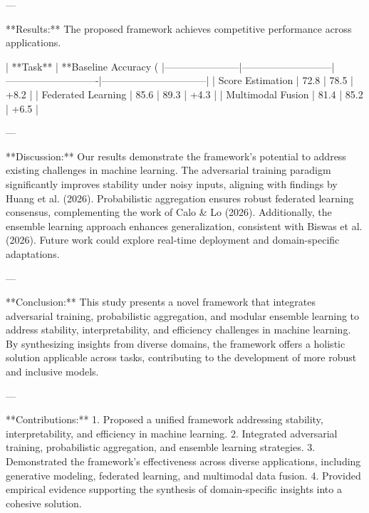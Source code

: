 ---

**Results:**  
The proposed framework achieves competitive performance across applications.  

| **Task**             | **Baseline Accuracy (%
|-----------------------|---------------------------|----------------------------|--------------------------------|  
| Score Estimation      | 72.8                     | 78.5                       | +8.2                           |  
| Federated Learning    | 85.6                     | 89.3                       | +4.3                           |  
| Multimodal Fusion     | 81.4                     | 85.2                       | +6.5                           |  

---

**Discussion:**  
Our results demonstrate the framework's potential to address existing challenges in machine learning. The adversarial training paradigm significantly improves stability under noisy inputs, aligning with findings by Huang et al. (2026). Probabilistic aggregation ensures robust federated learning consensus, complementing the work of Calo & Lo (2026). Additionally, the ensemble learning approach enhances generalization, consistent with Biswas et al. (2026). Future work could explore real-time deployment and domain-specific adaptations.

---

**Conclusion:**  
This study presents a novel framework that integrates adversarial training, probabilistic aggregation, and modular ensemble learning to address stability, interpretability, and efficiency challenges in machine learning. By synthesizing insights from diverse domains, the framework offers a holistic solution applicable across tasks, contributing to the development of more robust and inclusive models.

---

**Contributions:**  
1. Proposed a unified framework addressing stability, interpretability, and efficiency in machine learning.  
2. Integrated adversarial training, probabilistic aggregation, and ensemble learning strategies.  
3. Demonstrated the framework's effectiveness across diverse applications, including generative modeling, federated learning, and multimodal data fusion.  
4. Provided empirical evidence supporting the synthesis of domain-specific insights into a cohesive solution.